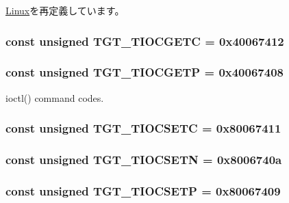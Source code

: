 \hyperlink{classLinux_a96e06e042526ea5e89c4e8a020636c52}{Linux}を再定義しています。\hypertarget{classAlphaLinux_ad4f95fbdb4f52f68481c247267675007}{
\subsubsection[{TGT\_\-TIOCGETC}]{\setlength{\rightskip}{0pt plus 5cm}const unsigned {\bf TGT\_\-TIOCGETC} = 0x40067412}}
\label{classAlphaLinux_ad4f95fbdb4f52f68481c247267675007}
\hypertarget{classAlphaLinux_a90fcc56bd4aa74a5d86c87bfeae77625}{
\subsubsection[{TGT\_\-TIOCGETP}]{\setlength{\rightskip}{0pt plus 5cm}const unsigned {\bf TGT\_\-TIOCGETP} = 0x40067408}}
\label{classAlphaLinux_a90fcc56bd4aa74a5d86c87bfeae77625}


ioctl() command codes. \hypertarget{classAlphaLinux_a98595955a801e37d1d5be450c203afe5}{
\subsubsection[{TGT\_\-TIOCSETC}]{\setlength{\rightskip}{0pt plus 5cm}const unsigned {\bf TGT\_\-TIOCSETC} = 0x80067411}}
\label{classAlphaLinux_a98595955a801e37d1d5be450c203afe5}
\hypertarget{classAlphaLinux_a6783bea53088dc89157c39a9a7c71988}{
\subsubsection[{TGT\_\-TIOCSETN}]{\setlength{\rightskip}{0pt plus 5cm}const unsigned {\bf TGT\_\-TIOCSETN} = 0x8006740a}}
\label{classAlphaLinux_a6783bea53088dc89157c39a9a7c71988}
\hypertarget{classAlphaLinux_a194059e48b091a80833c40b500e70bec}{
\subsubsection[{TGT\_\-TIOCSETP}]{\setlength{\rightskip}{0pt plus 5cm}const unsigned {\bf TGT\_\-TIOCSETP} = 0x80067409}}
\label{classAlphaLinux_a194059e48b091a80833c40b500e70bec}


